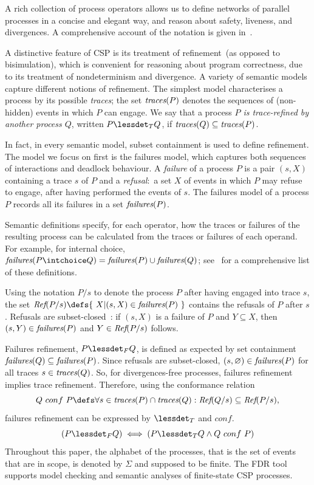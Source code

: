 A rich collection of process operators allows us to define networks of
parallel processes in a concise and elegant way, and reason about safety,
liveness, and divergences.  A comprehensive account of the notation is given
in~\cite{Roscoe2010}.

A distinctive feature of CSP is its treatment of refinement~(as opposed to
bisimulation), which is convenient for reasoning about program correctness,
due to its treatment of nondeterminism and divergence.  A variety of semantic
models capture different notions of refinement. The simplest model
characterises a process by its possible \emph{traces}; the set $\text{\it traces}(P)$
denotes the sequences of (non-hidden) events in which $P$ can engage.  We say
that a process \emph{$P$ is trace-refined by another process $Q$}, written $P
\lessdet_T Q$, if $\text{\it traces}(Q)\subseteq \text{\it traces}(P)$.

In fact, in every semantic model, subset containment is used to define refinement. The
model we focus on first is the failures model, which captures both
sequences of interactions and deadlock behaviour. A \emph{failure} of a process $P$
is a pair $(s,X)$ containing a trace $s$ of $P$ and a \emph{refusal}:~a set $X$ of
events in which $P$ may refuse to engage, after having performed the events of
$s$. The failures model of a process $P$ records all its failures in a set
$\text{\it failures}(P)$.

Semantic definitions specify, for each operator, how the traces or failures
of the resulting process can be calculated from the traces or failures of
each operand. For example, for internal choice, $\fails(P\intchoice Q) =
\fails(P)\cup\fails(Q)$; see~\cite[p.~210]{Roscoe:1997:TPC:550448} for a
comprehensive list of these definitions.

Using the notation $P/s$ to denote the process $P$ after having engaged into
trace $s$, the set $\refs(P/s) \defs \{~X | (s,X) \in \fails(P)~\}$ contains
the  refusals of $P$ after $s$. Refusals are
subset-closed~\cite{Hoare:1985:CSP:3921,Roscoe2010}: if $(s,X)$ is a failure
of $P$ and $Y\subseteq X$, then $(s,Y)\in\text{\it failures}(P)$ and $Y\in\text{\it Ref}(P/s)$
follows.

Failures refinement, $P \lessdet_F Q$, is defined as expected by set
containment $\text{\it failures}(Q)\subseteq\text{\it failures}(P)$. Since refusals are subset-closed,
$(s,\varnothing)\in\text{\it failures}(P)$ for all traces $s\in\text{\it traces}(Q)$. So, for
divergences-free processes, failures refinement implies trace refinement.
Therefore, using the conformance relation
%
\begin{equation}\label{eq:conf}
  Q\ conf\ P \defs \forall s\in \trc(P) \cap \trc(Q): \refs(Q/s)
  \subseteq \refs(P/s),
\end{equation}
%
failures refinement can be expressed by $\lessdet_T$ and $conf$.
%
\begin{equation}\label{thm:fref-tref-conf}
(P \lessdet_F Q) \iff (P \lessdet_T Q \land Q\ conf\ P)
\end{equation}
%
Throughout this paper, the alphabet of the processes, that is the set of
events that are in scope, is denoted by $\Sigma$ and supposed to be finite.
The FDR tool~\cite{fdr} supports model checking and semantic analyses of
finite-state CSP processes.

